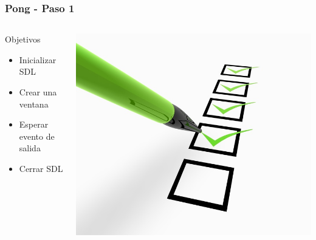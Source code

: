 \begin{frame}
	\frametitle{Pong - Paso 1}
	
    \begin{columns}[c]
	\column{175pt}
	\begin{block}{Objetivos}
		\begin{itemize}
			\item Inicializar SDL
			\item Crear una ventana
			\item Esperar evento de salida
			\item Cerrar SDL
		\end{itemize}            
	\end{block}
    \column{125pt}
	\begin{center}
		\includegraphics[scale=0.6]{img/checklist.jpg}
	\end{center}	
	
    \end{columns}

\end{frame}

